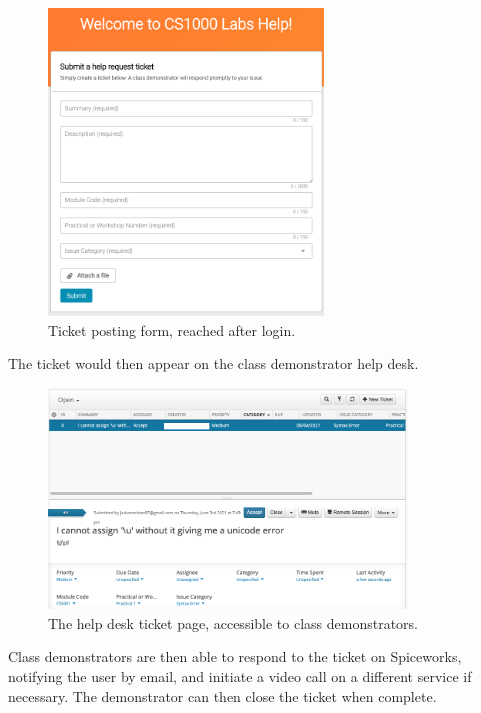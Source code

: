 \FloatBarrier
\begin{figure}[H]
  \centering
  \includegraphics[width=0.65\textwidth]{2context/images/SWpostTicket.png}
  \caption{Ticket posting form, reached after login.}
\end{figure}

The ticket would then appear on the class demonstrator help desk.

\FloatBarrier
\begin{figure}[H]
  \centering
  \includegraphics[width=0.85\textwidth]{2context/images/SWticketPage.png}
  \caption{The help desk ticket page, accessible to class demonstrators.}
\end{figure}

Class demonstrators are then able to respond to the ticket on Spiceworks, notifying the user by email, and initiate a video call on a different service if necessary. The demonstrator can then close the ticket when complete.

